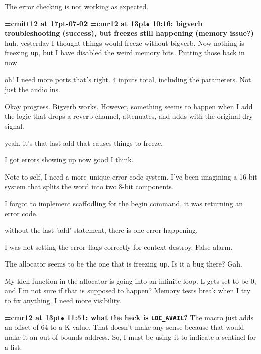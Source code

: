 The error checking is not working as expected.
\par

{\medskip\noindent\bf\font\titlefont=cmitt12 at 17pt-07-02}\medskip
{\smallskip\noindent\bf\font\titlefont=cmr12 at 13pt\titlefont $\bullet$ 10:16: bigverb troubleshooting (success), but freezes still happening (memory issue?)}\smallskip
huh. yesterday I thought things would freeze without bigverb. Now nothing is freezing up, but I have disabled the weird memory bits. Putting those back in now.
\par

oh! I need more ports that's right. 4 inputs total, including the parameters. Not just the audio ins.
\par

Okay progress. Bigverb works. However, something seems to happen when I add the logic that drops a reverb channel, attenuates, and adds with the original dry signal.
\par

yeah, it's that last add that causes things to freeze.
\par

I got errors showing up now good I think.
\par

Note to self, I need a more unique error code system. I've been imagining a 16-bit system that splits the word into two 8-bit components.
\par

I forgot to implement scaffodling for the begin command, it was returning an error code.
\par

without the last 'add' statement, there is one error happening.
\par

I was not setting the error flags correctly for context destroy. False alarm.
\par

The allocator seems to be the one that is freezing up. Is it a bug there? Gah.
\par

My klen function in the allocator is going into an infinite loop. L gets set to be 0, and I'm not sure if that is supposed to happen? Memory tests break when I try to fix anything. I need more visibility.
\par

{\smallskip\noindent\bf\font\titlefont=cmr12 at 13pt\titlefont $\bullet$ 11:51: what the heck is {\tt LOC\_AVAIL}?}\smallskip
The macro just adds an offset of 64 to a K value. That doesn't make any sense because that would make it an out of bounds address. So, I must be using it to indicate a sentinel for a list.
\par


